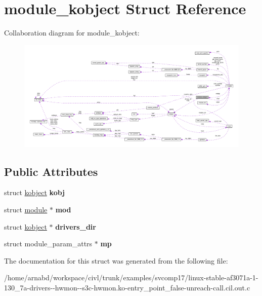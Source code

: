 \hypertarget{structmodule__kobject}{}\section{module\+\_\+kobject Struct Reference}
\label{structmodule__kobject}


Collaboration diagram for module\+\_\+kobject\+:
\nopagebreak
\begin{figure}[H]
\begin{center}
\leavevmode
\includegraphics[width=350pt]{structmodule__kobject__coll__graph}
\end{center}
\end{figure}
\subsection*{Public Attributes}
\begin{DoxyCompactItemize}
\item 
\hypertarget{structmodule__kobject_aa92e279575b85e93f1f1c787a5676dd0}{}struct \hyperlink{structkobject}{kobject} {\bfseries kobj}\label{structmodule__kobject_aa92e279575b85e93f1f1c787a5676dd0}

\item 
\hypertarget{structmodule__kobject_a7c4176e2411eb3f593fa1e0f988c7d55}{}struct \hyperlink{structmodule}{module} $\ast$ {\bfseries mod}\label{structmodule__kobject_a7c4176e2411eb3f593fa1e0f988c7d55}

\item 
\hypertarget{structmodule__kobject_a371951ccebcb90fcdfa22f46c4a14066}{}struct \hyperlink{structkobject}{kobject} $\ast$ {\bfseries drivers\+\_\+dir}\label{structmodule__kobject_a371951ccebcb90fcdfa22f46c4a14066}

\item 
\hypertarget{structmodule__kobject_a9dd7345b8c9e742a5dbe2041400ed65b}{}struct module\+\_\+param\+\_\+attrs $\ast$ {\bfseries mp}\label{structmodule__kobject_a9dd7345b8c9e742a5dbe2041400ed65b}

\end{DoxyCompactItemize}


The documentation for this struct was generated from the following file\+:\begin{DoxyCompactItemize}
\item 
/home/arnabd/workspace/civl/trunk/examples/svcomp17/linux-\/stable-\/af3071a-\/1-\/130\+\_\+7a-\/drivers-\/-\/hwmon-\/-\/s3c-\/hwmon.\+ko-\/entry\+\_\+point\+\_\+false-\/unreach-\/call.\+cil.\+out.\+c\end{DoxyCompactItemize}
